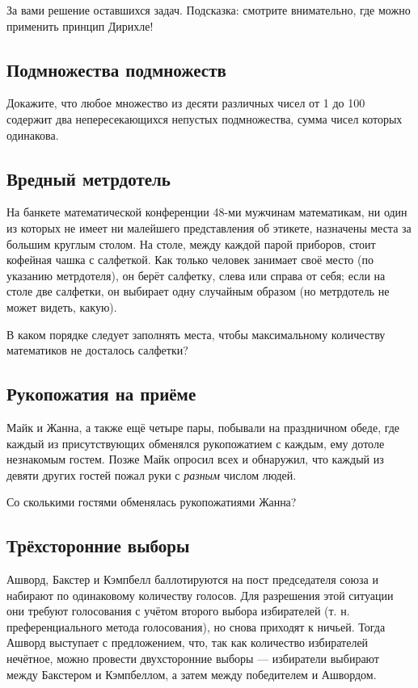 За вами решение оставшихся задач.
Подсказка: смотрите внимательно, где можно применить принцип Дирихле!

\subsection*{Подмножества подмножеств}%

Докажите, что любое множество из десяти различных чисел от 1 до 100 содержит два непересекающихся непустых подмножества, сумма чисел которых одинакова.

\subsection*{Вредный метрдотель}%

На банкете математической конференции 48-ми мужчинам математикам, ни один из которых не имеет ни малейшего представления об этикете, назначены места за большим круглым столом.
На столе, между каждой парой приборов, стоит кофейная чашка с салфеткой.
Как только человек занимает своё место (по указанию метрдотеля), он берёт салфетку, слева или справа от себя; если на столе две салфетки, он выбирает одну случайным образом (но метрдотель не может видеть, какую).

В каком порядке следует заполнять места, чтобы максимальному количеству математиков не досталось салфетки?

\subsection*{Рукопожатия на приёме}%

Майк и Жанна, а также ещё четыре пары, побывали на праздничном обеде, где каждый из присутствующих обменялся рукопожатием с каждым, ему дотоле незнакомым гостем.
Позже Майк опросил всех и обнаружил, что каждый из девяти других гостей пожал руки с \emph{разным} числом людей.

Со сколькими гостями обменялась рукопожатиями Жанна?

\subsection*{Трёхсторонние выборы}%

Ашворд, Бакстер и Кэмпбелл баллотируются на пост председателя союза %
и набирают по одинаковому количеству голосов.
Для разрешения этой ситуации они требуют голосования с учётом второго выбора избирателей (т. н. преференциального метода голосования), но снова приходят к ничьей.
Тогда Ашворд выступает с предложением, что, так как количество избирателей нечётное, можно провести двухсторонние выборы --- избиратели выбирают между Бакстером и Кэмпбеллом, а затем между победителем и Ашвордом.

